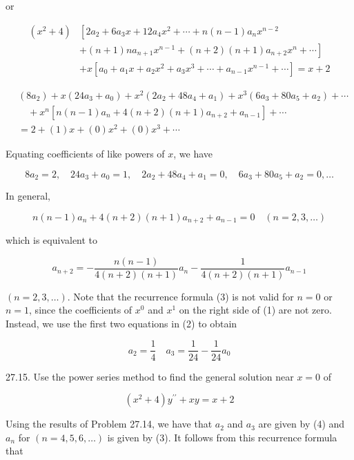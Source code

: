 \documentclass[10pt]{article}
\begin{document}
or

$$
\begin{aligned}
\left(x^{2}+4\right) & {\left[2 a_{2}+6 a_{3} x+12 a_{4} x^{2}+\cdots+n(n-1) a_{n} x^{n-2}\right.} \\
& \left.+(n+1) n a_{n+1} x^{n-1}+(n+2)(n+1) a_{n+2} x^{n}+\cdots\right] \\
& +x\left[a_{0}+a_{1} x+a_{2} x^{2}+a_{3} x^{3}+\cdots+a_{n-1} x^{n-1}+\cdots\right]=x+2
\end{aligned}
$$


\begin{align*}
& \left(8 a_{2}\right)+x\left(24 a_{3}+a_{0}\right)+x^{2}\left(2 a_{2}+48 a_{4}+a_{1}\right)+x^{3}\left(6 a_{3}+80 a_{5}+a_{2}\right)+\cdots \\
& \quad+x^{n}\left[n(n-1) a_{n}+4(n+2)(n+1) a_{n+2}+a_{n-1}\right]+\cdots \\
& =2+(1) x+(0) x^{2}+(0) x^{3}+\cdots \tag{1}
\end{align*}


Equating coefficients of like powers of $x$, we have


\begin{equation*}
8 a_{2}=2, \quad 24 a_{3}+a_{0}=1, \quad 2 a_{2}+48 a_{4}+a_{1}=0, \quad 6 a_{3}+80 a_{5}+a_{2}=0, \ldots \tag{2}
\end{equation*}


In general,

$$
n(n-1) a_{n}+4(n+2)(n+1) a_{n+2}+a_{n-1}=0 \quad(n=2,3, \ldots)
$$

which is equivalent to


\begin{equation*}
a_{n+2}=-\frac{n(n-1)}{4(n+2)(n+1)} a_{n}-\frac{1}{4(n+2)(n+1)} a_{n-1} \tag{3}
\end{equation*}


$(n=2,3, \ldots)$. Note that the recurrence formula (3) is not valid for $n=0$ or $n=1$, since the coefficients of $x^{0}$ and $x^{1}$ on the right side of (1) are not zero. Instead, we use the first two equations in (2) to obtain


\begin{equation*}
a_{2}=\frac{1}{4} \quad a_{3}=\frac{1}{24}-\frac{1}{24} a_{0} \tag{4}
\end{equation*}


27.15. Use the power series method to find the general solution near $x=0$ of

$$
\left(x^{2}+4\right) y^{\prime \prime}+x y=x+2
$$

Using the results of Problem 27.14, we have that $a_{2}$ and $a_{3}$ are given by (4) and $a_{n}$ for $(n=4,5,6, \ldots)$ is given by (3). It follows from this recurrence formula that
\end{document}
